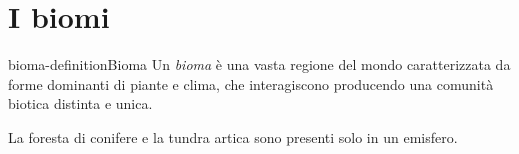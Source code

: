 \documentclass[preview]{standalone}
\begin{document}
\genpage

\section{I biomi}

\begin{snippetdefinition}{bioma-definition}{Bioma}
    Un \textit{bioma} è una vasta regione del mondo caratterizzata da forme dominanti
    di piante e clima, che interagiscono producendo una comunità biotica distinta e unica.
\end{snippetdefinition}


\begin{plainhtml}
    La foresta di conifere e la tundra artica sono presenti solo in un emisfero.
\end{plainhtml}

\end{document}
